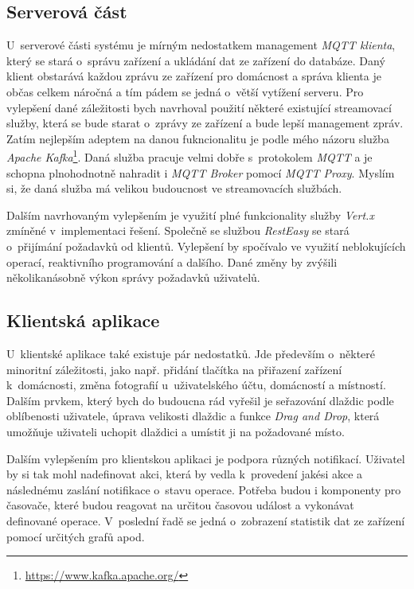 \subsection*{Serverová část}
\label{testovani:navrh:server}
U~serverové části systému je mírným nedostatkem management \emph{MQTT klienta}, který se stará o~správu zařízení a ukládání dat ze zařízení do databáze.
Daný klient obstarává každou zprávu ze zařízení pro domácnost a správa klienta je občas celkem náročná a tím pádem se jedná o~větší vytížení serveru.
Pro vylepšení dané záležitosti bych navrhoval použití některé existující streamovací služby, která se bude starat o~zprávy ze zařízení a bude lepší management zpráv.
Zatím nejlepším adeptem na danou fukncionalitu je podle mého názoru služba \emph{Apache Kafka}\footnote{\url{https://www.kafka.apache.org/}}.
Daná služba pracuje velmi dobře s~protokolem \emph{MQTT} a je schopna plnohodnotně nahradit i \emph{MQTT Broker} pomocí \emph{MQTT Proxy}.
Myslím si, že daná služba má velikou budoucnost ve streamovacích službách.

Dalším navrhovaným vylepšením je využití plné funkcionality služby \emph{Vert.x} zmíněné v~implementaci řešení.
Společně se službou \emph{RestEasy} se stará o~přijímání požadavků od klientů.
Vylepšení by spočívalo ve využití neblokujících operací, reaktivního programování a dalšího.
Dané změny by zvýšili několikanásobně výkon správy požadavků uživatelů.

\subsection*{Klientská aplikace}
\label{testovani:navrh:frontend}
U~klientské aplikace také existuje pár nedostatků.
Jde především o~některé minoritní záležitosti, jako např. přidání tlačítka na přiřazení zařízení k~domácnosti, změna fotografií u~uživatelského účtu, domácností a místností.
Dalším prvkem, který bych do budoucna rád vyřešil je seřazování dlaždic podle oblíbenosti uživatele, úprava velikosti dlaždic a funkce \emph{Drag and Drop}, která umožňuje uživateli uchopit dlaždici a umístit ji na požadované místo.

Dalším vylepšením pro klientskou aplikaci je podpora různých notifikací.
Uživatel by si tak mohl nadefinovat akci, která by vedla k~provedení jakési akce a následnému zaslání notifikace o~stavu operace.
Potřeba budou i komponenty pro časovače, které budou reagovat na určitou časovou událost a vykonávat definované operace.
V~poslední řadě se jedná o~zobrazení statistik dat ze zařízení pomocí určitých grafů apod.

